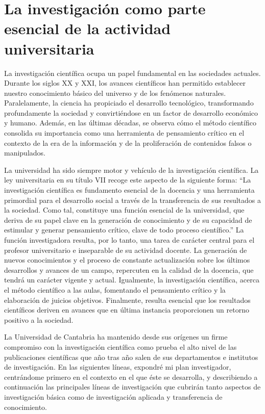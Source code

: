\section{La investigación como parte esencial de la actividad universitaria}

La investigación científica ocupa un papel fundamental en las sociedades actuales. Durante los siglos XX y XXI, los avances científicos han permitido establecer nuestro conocimiento básico del universo y de los fenómenos naturales. Paralelamente, la ciencia ha propiciado el desarrollo tecnológico, transformando profundamente la sociedad y convirtiéndose en un factor de desarrollo económico y humano. Además, en las últimas décadas, se observa cómo el método científico consolida su importancia como una herramienta de pensamiento crítico en el contexto de la era de la información y de la proliferación de contenidos falsos o manipulados.

La universidad ha sido siempre motor y vehículo de la investigación científica. La ley universitaria en su título VII recoge este aspecto de la siguiente forma: ``La investigación científica es fundamento esencial de la docencia y una herramienta primordial para el desarrollo social a través de la transferencia de sus resultados a la sociedad. Como tal, constituye una función esencial de la universidad, que deriva de su papel clave en la generación de conocimiento y de su capacidad de estimular y generar pensamiento crítico, clave de todo proceso científico.'' La función investigadora resulta, por lo tanto, una tarea de carácter central para el profesor universitario e inseparable de su actividad docente. La generación de nuevos conocimientos y el proceso de constante actualización sobre los últimos desarrollos y avances de un campo, repercuten en la calidad de la docencia, que tendrá un carácter vigente y actual. Igualmente, la investigación científica, acerca el método científico a las aulas, fomentando el pensamiento crítico y la elaboración de juicios objetivos. Finalmente, resulta esencial que los resultados científicos deriven en avances que en última instancia proporcionen un retorno positivo a la sociedad.

La Universidad de Cantabria ha mantenido desde sus orígenes un firme compromiso con la investigación científica como prueba el alto nivel de las publicaciones científicas que año tras año salen de sus departamentos e institutos de investigación. En las siguientes líneas, expondré mi plan investigador, centrándome primero en el contexto en el que éste se desarrolla, y describiendo a continuación las principales líneas de investigación que cubrirán tanto aspectos de investigación básica como de investigación aplicada y transferencia de conocimiento. 




